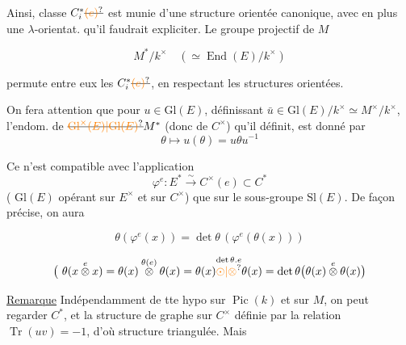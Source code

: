 Ainsi,   classe $C_i^*\deleted{\unsure{(e)}}$  est munie   d'une structure   orientée canonique,  avec en plus une $\lambda$-orientat.  qu'il faudrait expliciter. Le groupe projectif de $M$

\[
 M^*/k^\times\quad(\simeq\operatorname{End}(E)/k^\times)
\]


permute entre  eux les $C_i^*\deleted{\unsure{(e)}}$, en respectant  les structures orientées.

On fera attention que pour  $u\in\mathrm{Gl}(E)$, définissant $\bar u\in\mathrm{Gl}(E)/k^\times\simeq M^\times/k^\times$, l'endom. de $\deleted{\unsure{\mathrm{Gl}^{\times}(E)|\mathrm{Gl}(E)}}M^*$  (donc de $C^\times$) qu'il définit, est donné par
\[
 \theta\longmapsto u(\theta)=u\theta u^{-1}
\]


Ce n'est compatible avec l'application
\[
 \varphi^e:E^*\xrightarrow{\sim} C^\times(e)\subset C^*
\]
( $\mathrm{Gl}(E)$ opérant sur $E^\times$ et sur $C^\times$) que sur le sous-groupe $\mathrm{Sl}(E)$. De façon précise, on aura

\[
 \boxed{\theta(\varphi^e(x))=\det\theta\,(\varphi^e(\theta(x)))}
\]

\[
 \bigl(\ \theta(x\overset{e}{\otimes}x)=
 \theta(x)\overset{\theta(e)}{\otimes}\theta(x)=
 \theta(x)\overset{\det\theta.e}{\unsure{\odot|\otimes}}\theta(x)
 =\det\theta\bigl(\theta(x)\overset{e}{\otimes}\theta(x)\bigr)
\]

\uline{Remarque} Indépendamment de tte hypo sur $\operatorname{Pic}(k)$ et sur $M$, on peut regarder $C^*$, et la structure de graphe sur $C^\times$ définie par la relation $\operatorname{Tr}(uv)=-1$, d'où structure triangulée. Mais

